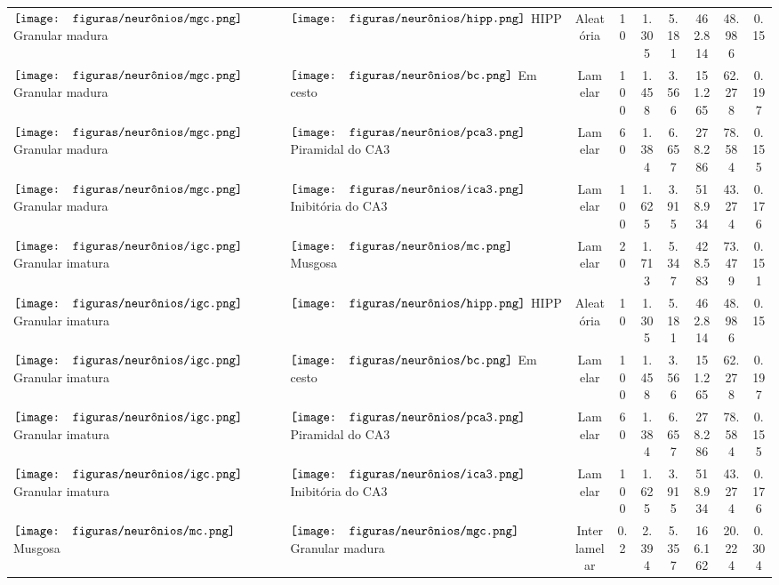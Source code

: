 \begin{table}[h!]
{\begin{tabular}{llccccccc}
$\vcenter{\hbox{\texttt{[image: figuras/neurônios/mgc.png]}}}$ Granular madura & $\vcenter{\hbox{\texttt{[image: figuras/neurônios/hipp.png]}}}$ HIPP & Aleatória & 10 & 1.305 & 5.181 & 462.814 & 48.986 & 0.15 \\
$\vcenter{\hbox{\texttt{[image: figuras/neurônios/mgc.png]}}}$ Granular madura & $\vcenter{\hbox{\texttt{[image: figuras/neurônios/bc.png]}}}$ Em cesto & Lamelar & 100 & 1.458 & 3.566 & 151.265 & 62.278 & 0.197 \\
$\vcenter{\hbox{\texttt{[image: figuras/neurônios/mgc.png]}}}$ Granular madura & $\vcenter{\hbox{\texttt{[image: figuras/neurônios/pca3.png]}}}$ Piramidal do CA3 & Lamelar & 60 & 1.384 & 6.657 & 278.286 & 78.584 & 0.155 \\
$\vcenter{\hbox{\texttt{[image: figuras/neurônios/mgc.png]}}}$ Granular madura & $\vcenter{\hbox{\texttt{[image: figuras/neurônios/ica3.png]}}}$ Inibitória do CA3 & Lamelar & 100 & 1.625 & 3.915 & 518.934 & 43.274 & 0.176 \\
$\vcenter{\hbox{\texttt{[image: figuras/neurônios/igc.png]}}}$ Granular imatura & $\vcenter{\hbox{\texttt{[image: figuras/neurônios/mc.png]}}}$ Musgosa & Lamelar & 20 & 1.713 & 5.347 & 428.583 & 73.479 & 0.151 \\
$\vcenter{\hbox{\texttt{[image: figuras/neurônios/igc.png]}}}$ Granular imatura & $\vcenter{\hbox{\texttt{[image: figuras/neurônios/hipp.png]}}}$ HIPP & Aleatória & 10 & 1.305 & 5.181 & 462.814 & 48.986 & 0.15 \\
$\vcenter{\hbox{\texttt{[image: figuras/neurônios/igc.png]}}}$ Granular imatura & $\vcenter{\hbox{\texttt{[image: figuras/neurônios/bc.png]}}}$ Em cesto & Lamelar & 100 & 1.458 & 3.566 & 151.265 & 62.278 & 0.197 \\
$\vcenter{\hbox{\texttt{[image: figuras/neurônios/igc.png]}}}$ Granular imatura & $\vcenter{\hbox{\texttt{[image: figuras/neurônios/pca3.png]}}}$ Piramidal do CA3 & Lamelar & 60 & 1.384 & 6.657 & 278.286 & 78.584 & 0.155 \\
$\vcenter{\hbox{\texttt{[image: figuras/neurônios/igc.png]}}}$ Granular imatura & $\vcenter{\hbox{\texttt{[image: figuras/neurônios/ica3.png]}}}$ Inibitória do CA3 & Lamelar & 100 & 1.625 & 3.915 & 518.934 & 43.274 & 0.176 \\
$\vcenter{\hbox{\texttt{[image: figuras/neurônios/mc.png]}}}$ Musgosa & $\vcenter{\hbox{\texttt{[image: figuras/neurônios/mgc.png]}}}$ Granular madura & Interlamelar & 0.2 & 2.394 & 5.357 & 166.162 & 20.224 & 0.304 \\

\end{tabular}}
\end{table}
